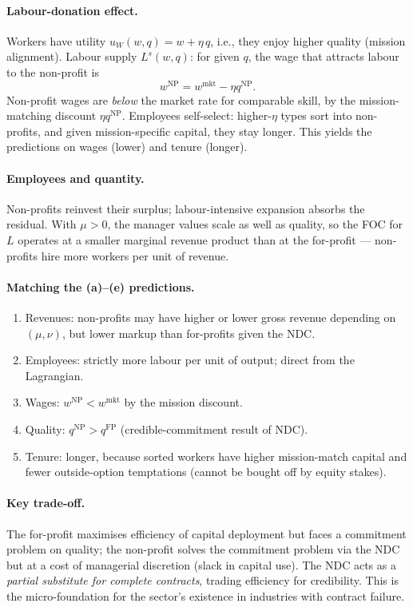 \documentclass[11pt,a4paper]{article}
\begin{document}
\paragraph{Labour-donation effect.}
Workers have utility $u_{W}(w,q)=w+\eta\,q$, i.e., they enjoy higher quality (mission alignment). Labour supply $L^{s}(w,q)$: for given $q$, the wage that attracts labour to the non-profit is
\[
w^{\mathrm{NP}}=w^{\mathrm{mkt}}-\eta q^{\mathrm{NP}}.
\]
Non-profit wages are \emph{below} the market rate for comparable skill, by the mission-matching discount $\eta q^{\mathrm{NP}}$. Employees self-select: higher-$\eta$ types sort into non-profits, and given mission-specific capital, they stay longer. This yields the predictions on wages (lower) and tenure (longer).

\paragraph{Employees and quantity.}
Non-profits reinvest their surplus; labour-intensive expansion absorbs the residual. With $\mu>0$, the manager values scale as well as quality, so the FOC for $L$ operates at a smaller marginal revenue product than at the for-profit --- non-profits hire more workers per unit of revenue.

\paragraph{Matching the (a)--(e) predictions.}
\begin{enumerate}[leftmargin=*,itemsep=1pt]
    \item[(a)] Revenues: non-profits may have higher or lower gross revenue depending on $(\mu,\nu)$, but lower markup than for-profits given the NDC.
    \item[(b)] Employees: strictly more labour per unit of output; direct from the Lagrangian.
    \item[(c)] Wages: $w^{\mathrm{NP}}<w^{\mathrm{mkt}}$ by the mission discount.
    \item[(d)] Quality: $q^{\mathrm{NP}}>q^{\mathrm{FP}}$ (credible-commitment result of NDC).
    \item[(e)] Tenure: longer, because sorted workers have higher mission-match capital and fewer outside-option temptations (cannot be bought off by equity stakes).
\end{enumerate}

\paragraph{Key trade-off.}
The for-profit maximises efficiency of capital deployment but faces a commitment problem on quality; the non-profit solves the commitment problem via the NDC but at a cost of managerial discretion (slack in capital use). The NDC acts as a \emph{partial substitute for complete contracts}, trading efficiency for credibility. This is the micro-foundation for the sector's existence in industries with contract failure.
\end{document}
